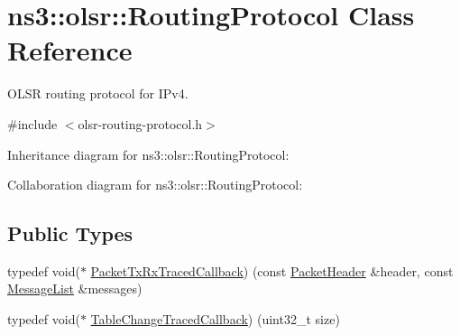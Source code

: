 \hypertarget{classns3_1_1olsr_1_1RoutingProtocol}{}\section{ns3\+:\+:olsr\+:\+:Routing\+Protocol Class Reference}
\label{classns3_1_1olsr_1_1RoutingProtocol}


O\+L\+SR routing protocol for I\+Pv4.  




{\ttfamily \#include $<$olsr-\/routing-\/protocol.\+h$>$}



Inheritance diagram for ns3\+:\+:olsr\+:\+:Routing\+Protocol\+:


Collaboration diagram for ns3\+:\+:olsr\+:\+:Routing\+Protocol\+:
\subsection*{Public Types}
\begin{DoxyCompactItemize}
\item 
typedef void($\ast$ \hyperlink{classns3_1_1olsr_1_1RoutingProtocol_a64c1999631417f35bf80c92689289378}{Packet\+Tx\+Rx\+Traced\+Callback}) (const \hyperlink{classns3_1_1olsr_1_1PacketHeader}{Packet\+Header} \&header, const \hyperlink{namespacens3_1_1olsr_af17c710718a5637d01f37804a0a53e78}{Message\+List} \&messages)
\item 
typedef void($\ast$ \hyperlink{classns3_1_1olsr_1_1RoutingProtocol_a3a82409b9429c015aa41b68848c40cd5}{Table\+Change\+Traced\+Callback}) (uint32\+\_\+t size)
\end{DoxyCompactItemize}
